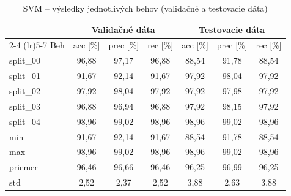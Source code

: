 \begin{table}[H]
    \centering
    \caption{SVM -- výsledky jednotlivých behov (validačné a testovacie dáta)}
    \label{tab:runs-svm}
    \footnotesize
    \begin{tabular}{lcccccc}
        \toprule
         & \multicolumn{3}{c}{Validačné dáta} & \multicolumn{3}{c}{Testovacie dáta} \\
        \cmidrule(lr){2-4} \cmidrule(lr){5-7}
        Beh & acc [\%] & prec [\%] & rec [\%] & acc [\%] & prec [\%] & rec [\%] \\
        \midrule
        split\_00 & 96,88 & 97,17 & 96,88 & 88,54 & 91,78 & 88,54 \\
        split\_01 & 91,67 & 92,14 & 91,67 & 97,92 & 98,04 & 97,92 \\
        split\_02 & 97,92 & 98,04 & 97,92 & 97,92 & 97,98 & 97,92 \\
        split\_03 & 96,88 & 96,94 & 96,88 & 97,92 & 98,15 & 97,92 \\
        split\_04 & 98,96 & 99,02 & 98,96 & 98,96 & 99,02 & 98,96 \\
        \midrule
        min & 91,67 & 92,14 & 91,67 & 88,54 & 91,78 & 88,54 \\
        max & 98,96 & 99,02 & 98,96 & 98,96 & 99,02 & 98,96 \\
        priemer & 96,46 & 96,66 & 96,46 & 96,25 & 96,99 & 96,25 \\
        std & 2,52 & 2,37 & 2,52 & 3,88 & 2,63 & 3,88 \\
        \bottomrule
    \end{tabular}
\end{table}
